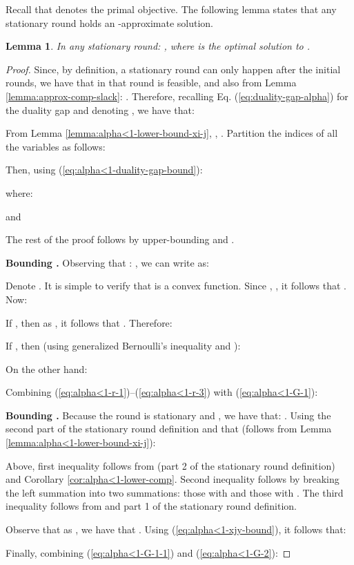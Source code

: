 \documentclass[11pt]{article}
\newtheorem{lemma}[theorem]{Lemma}
\begin{document}
Recall that  denotes the primal objective. The following lemma states that any stationary round holds an -approximate solution.
\begin{lemma}\label{lemma:alpha<1-stationary-round}
In any stationary round: , where  is the optimal solution to .
\end{lemma}
\begin{proof}
Since, by definition, a stationary round can only happen after the initial  rounds, we have that  in that round is feasible, and also from Lemma \ref{lemma:approx-comp-slack}: . Therefore, recalling Eq. (\ref{eq:duality-gap-alpha}) for the duality gap and denoting , we have that:


From Lemma \ref{lemma:alpha<1-lower-bound-xi-j}, , . Partition the indices of all the variables as follows:

Then, using (\ref{eq:alpha<1-duality-gap-bound}):

where:

and 

The rest of the proof follows by upper-bounding  and .

\noindent\textbf{Bounding .} Observing that : , we can write  as:

Denote . It is simple to verify that  is a convex function. Since , , it follows that . Now:

If , then as , it follows that . Therefore:

If , then (using generalized Bernoulli's inequality and ):

On the other hand:

Combining (\ref{eq:alpha<1-r-1})--(\ref{eq:alpha<1-r-3}) with (\ref{eq:alpha<1-G-1}):


\noindent\textbf{Bounding .} Because the round is stationary and , we have that: . Using the second part of the stationary round definition and that  (follows from Lemma \ref{lemma:alpha<1-lower-bound-xi-j}):

Above, first inequality follows from  (part 2 of the stationary round definition) and Corollary \ref{cor:alpha<1-lower-comp}. Second inequality follows by breaking the left summation into two summations: those with  and those with . The third inequality follows from  and part 1 of the stationary round definition.

Observe that as , we have that . Using (\ref{eq:alpha<1-xjy-bound}), it follows that:


Finally, combining (\ref{eq:alpha<1-G-1-1}) and (\ref{eq:alpha<1-G-2}):

\end{proof}
\end{document}
